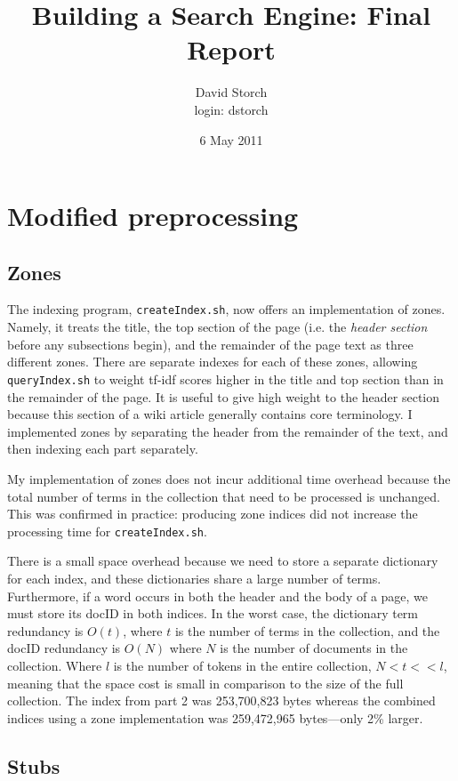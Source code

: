 \documentclass[11pt]{article}
\title{Building a Search Engine: Final Report}
\author{David Storch \\ login: dstorch}
\date{6 May 2011}
\begin{document}
\maketitle

\section{Modified preprocessing}

\subsection*{Zones}

The indexing program, \texttt{createIndex.sh}, now offers an implementation of zones.
Namely, it treats the title, the top section of the page (i.e. the \textit{header section} before any subsections begin), and the remainder
of the page text as three different zones. There are separate indexes for each of these zones, allowing
\texttt{queryIndex.sh} to weight tf-idf scores higher in the title and top section than in the remainder
of the page. It is useful to give high weight to the header section because this section of a wiki article generally contains core terminology.
I implemented zones by separating the header from the remainder of the
text, and then indexing each part separately.

My implementation of zones does not incur additional time overhead because
the total number of terms in the collection that need to be processed is unchanged. This was confirmed
in practice: producing zone indices did not increase the processing time for \texttt{createIndex.sh}.

There is a small space overhead because we need to store a separate dictionary for each index, and these dictionaries
share a large number of terms. Furthermore, if a word occurs in both the header and the body of a page, we must store its
docID in both indices. In the worst case, the dictionary term redundancy is $O(t)$,
where $t$ is the number of terms in the collection, and the docID redundancy is $O(N)$ where $N$ is the number of documents
in the collection. Where $l$ is the number of tokens in the entire collection, $N < t << l$, meaning that the space cost
is small in comparison to the size of the full collection. The index from part 2 was 253,700,823 bytes whereas the
combined indices using a zone implementation was 259,472,965 bytes---only 2\% larger.

\subsection*{Stubs}
\end{document}
